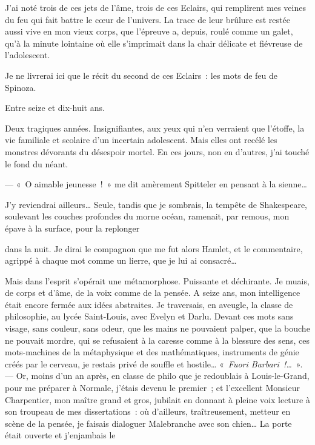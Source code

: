 J'ai noté trois de ces jets de l'âme, trois de ces Eclairs, qui
remplirent mes veines du feu qui fait battre le c\oe ur de l'univers. La
trace de leur brûlure est restée aussi vive en mon vieux corps, que
l'épreuve a, depuis, roulé comme un galet, qu'à la minute lointaine où
elle s'imprimait dans la chair délicate et fiévreuse de l'adolescent.

Je ne livrerai ici que le récit du second de ces Eclairs~: les mots de
feu de Spinoza.

Entre seize et dix-huit ans.

Deux tragiques années. Insignifiantes, aux yeux qui n'en verraient que
l'étoffe, la vie familiale et scolaire d'un incertain adolescent. Mais
elles ont recélé les monstres dévorants du désespoir mortel. En ces
jours, non en d'autres, j'ai touché le fond du néant.

--- «~O aimable jeunesse~!~» me dit amèrement Spitteler en pensant à la
sienne\ldots{}

J'y reviendrai ailleurs\ldots{} Seule, tandis que je sombrais, la tempête de
Shakespeare, soulevant les couches profondes du morne océan, ramenait,
par remous, mon épave à la surface, pour la replonger \linebreak

\quebra

\noindent{}dans la nuit. Je
dirai le compagnon que me fut alors Hamlet, et le commentaire, agrippé à
chaque mot comme un lierre, que je lui ai consacré\ldots{}

Mais dans l'esprit s'opérait une métamorphose. Puissante et déchirante.
Je muais, de corps et d'âme, de la voix comme de la pensée. A seize ans,
mon intelligence était encore fermée aux idées abstraites. Je
traversais, en aveugle, la classe de philosophie, au lycée Saint-Louis,
avec Evelyn et Darlu. Devant ces mots sans visage, sans couleur, sans
odeur, que les mains ne pouvaient palper, que la bouche ne pouvait
mordre, qui se refusaient à la caresse comme à la blessure des sens, ces
mots-machines de la métaphysique et des mathématiques, instruments de
génie créés par le cerveau, je restais privé de souffle et hostile\ldots{}
«~\emph{Fuori Barbari~!\ldots{}}~». --- Or, moins d'un an après, en classe de
philo que je redoublais à Louis-le-Grand, pour me préparer à Normale,
j'étais devenu le premier~; et l'excellent Monsieur Charpentier, mon
maître grand et gros, jubilait en donnant à pleine voix lecture à son
troupeau de mes dissertations~: où d'ailleurs, traîtreusement, metteur
en scène de la pensée, je faisais dialoguer Malebranche avec son
chien\ldots{} La porte était ouverte et j'enjambais le \linebreak

